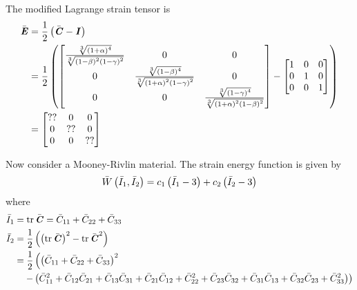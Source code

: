 The modified Lagrange strain tensor is
\begin{equation}
  \begin{split}
    \bar{\boldsymbol{\mathit{E}}} &= \frac{1}{2}\left( \bar{\boldsymbol{\mathit{C}}}-\boldsymbol{\mathit{I}} \right) \\
    &= \frac{1}{2}\left( \begin{bmatrix}
        \frac{ \sqrt[3]{\left( 1+\alpha \right)^{4}} }{ \sqrt[3]{\left( 1-\beta \right)^{2}\left( 1-\gamma \right)^{2}} }
        & 0 & 0 \\
        0 & \frac{ \sqrt[3]{\left( 1-\beta \right)^{4}} }{ \sqrt[3]{\left( 1+\alpha \right)^{2}\left( 1-\gamma \right)^{2}} }
        & 0  \\
        0 & 0 & \frac{ \sqrt[3]{\left( 1-\gamma \right)^{4}} }{ \sqrt[3]{\left( 1+\alpha \right)^{2}\left( 1-\beta \right)^{2}} }
      \end{bmatrix} - \begin{bmatrix}
        1 & 0 & 0 \\
        0 & 1 & 0 \\
        0 & 0 & 1
    \end{bmatrix} \right) \\
    &= \begin{bmatrix}
      ?? & 0 & 0\\
      0 & ?? & 0 \\
      0 & 0 & ??
    \end{bmatrix}
  \end{split}
\end{equation}

Now consider a Mooney-Rivlin material. The strain energy function is given by
\begin{equation}
   \bar{W}\left( \bar{I}_{1},\bar{I}_{2} \right) =c_{1}\left( \bar{I}_{1}-3 \right)+c_{2}\left( \bar{I}_{2}-3 \right)
\end{equation}
where
\begin{equation}
  \begin{split}
    \bar{I}_{1}&=\trace{}{\bar{\tensor{C}}}=\bar{C}_{11}+\bar{C}_{22}+\bar{C}_{33}\\
    \bar{I}_{2}&=\frac{1}{2}\pbrac{\pbrac{\trace{}{\bar{\tensor{C}}}}^{2}-\trace{}{\bar{\tensor{C}}^{2}}} \\
    &=\dfrac{1}{2}\left(\pbrac{\bar{C}_{11}+\bar{C}_{22}+\bar{C}_{33}}^{2}\right. \\
    & \quad\left.-\pbrac{\bar{C}_{11}^{2}+\bar{C}_{12}\bar{C}_{21}+\bar{C}_{13}\bar{C}_{31}+
      \bar{C}_{21}\bar{C}_{12}+\bar{C}_{22}^{2}+\bar{C}_{23}\bar{C}_{32}+\bar{C}_{31}\bar{C}_{13}+\bar{C}_{32}\bar{C}_{23}+\bar{C}_{33}^{2}}\right)
  \end{split}
\end{equation}

